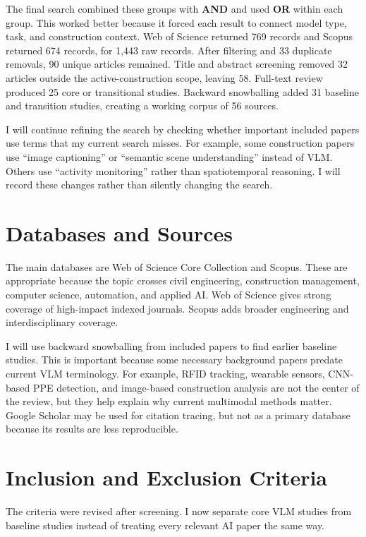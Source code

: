 \documentclass[10pt, letterpaper]{article}
\begin{document}
The final search combined these groups with \textbf{AND} and used \textbf{OR} within each group. This worked better because it forced each result to connect model type, task, and construction context. Web of Science returned 769 records and Scopus returned 674 records, for 1,443 raw records. After filtering and 33 duplicate removals, 90 unique articles remained. Title and abstract screening removed 32 articles outside the active-construction scope, leaving 58. Full-text review produced 25 core or transitional studies. Backward snowballing added 31 baseline and transition studies, creating a working corpus of 56 sources.

I will continue refining the search by checking whether important included papers use terms that my current search misses. For example, some construction papers use ``image captioning'' or ``semantic scene understanding'' instead of VLM. Others use ``activity monitoring'' rather than spatiotemporal reasoning. I will record these changes rather than silently changing the search.

\section{Databases and Sources}

The main databases are Web of Science Core Collection and Scopus. These are appropriate because the topic crosses civil engineering, construction management, computer science, automation, and applied AI. Web of Science gives strong coverage of high-impact indexed journals. Scopus adds broader engineering and interdisciplinary coverage.

I will use backward snowballing from included papers to find earlier baseline studies. This is important because some necessary background papers predate current VLM terminology. For example, RFID tracking, wearable sensors, CNN-based PPE detection, and image-based construction analysis are not the center of the review, but they help explain why current multimodal methods matter. Google Scholar may be used for citation tracing, but not as a primary database because its results are less reproducible.

\section{Inclusion and Exclusion Criteria}

The criteria were revised after screening. I now separate core VLM studies from baseline studies instead of treating every relevant AI paper the same way.
\end{document}
